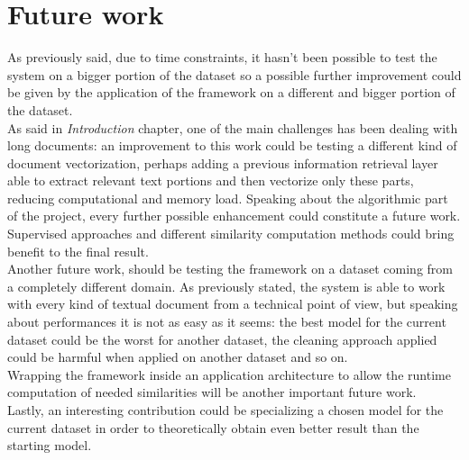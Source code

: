 \documentclass[\main/main.tex]{subfiles}
\begin{document}
\section{Future work}
As previously said, due to time constraints, it hasn't been possible to test the system on a bigger portion of the dataset so a possible further improvement could be given by the application of the framework on a different and bigger portion of the dataset. \\
As said in \emph{Introduction} chapter, one of the main challenges has been dealing with long documents: an improvement to this work could be testing a different kind of document vectorization, perhaps adding a previous information retrieval layer able to extract relevant text portions and then vectorize only these parts, reducing computational and memory load. Speaking about the algorithmic part of the project, every further possible enhancement could constitute a future work. Supervised approaches and different similarity computation methods could bring benefit to the final result.\\
Another future work, should be testing the framework on a dataset coming from a completely different domain. As previously stated, the system is able to work with every kind of textual document from a technical point of view, but speaking about performances it is not as easy as it seems: the best model for the current dataset could be the worst for another dataset, the cleaning approach applied could be harmful when applied on another dataset and so on.\\
Wrapping the framework inside an application architecture to allow the runtime computation of needed similarities will be another important future work. \\
Lastly, an interesting contribution could be specializing a chosen model for the current dataset in order to theoretically obtain even better result than the starting model.
\end{document}
